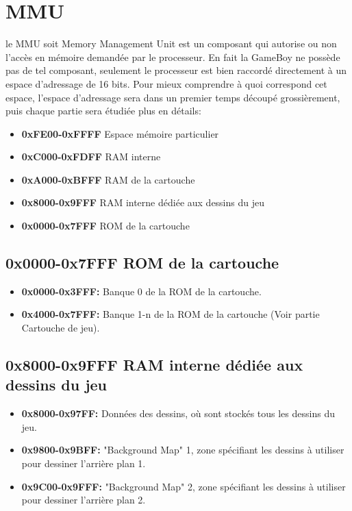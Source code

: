 \documentclass{report}
\begin{document}
\section{MMU}
le MMU soit Memory Management Unit est un composant qui autorise ou non l'accès en mémoire demandée par le processeur.
En fait la GameBoy ne possède pas de tel composant, seulement le processeur est bien raccordé directement à un espace d'adressage de 16 bits.
Pour mieux comprendre à quoi correspond cet espace, l'espace d'adressage sera
dans un premier temps découpé grossièrement, puis chaque partie sera étudiée
plus en détails:\\
\begin{itemize}
\item \textbf{0xFE00-0xFFFF} Espace mémoire particulier
\item \textbf{0xC000-0xFDFF} RAM interne
\item \textbf{0xA000-0xBFFF} RAM de la cartouche
\item \textbf{0x8000-0x9FFF} RAM interne dédiée aux dessins du jeu
\item \textbf{0x0000-0x7FFF} ROM de la cartouche
\end{itemize}

\subsection{0x0000-0x7FFF ROM de la cartouche}
\begin{itemize}
\item \textbf{0x0000-0x3FFF:} Banque 0 de la ROM de la cartouche.
\item \textbf{0x4000-0x7FFF:} Banque 1-n de la ROM de la cartouche (Voir partie Cartouche de jeu).
\end{itemize}

\subsection{0x8000-0x9FFF RAM interne dédiée aux dessins du jeu}
\begin{itemize}
\item \textbf{0x8000-0x97FF:} Données des dessins, où sont stockés tous les dessins du jeu.
\item \textbf{0x9800-0x9BFF:} "Background Map" 1, zone spécifiant les dessins à utiliser pour dessiner l'arrière plan 1.
\item \textbf{0x9C00-0x9FFF:} "Background Map" 2, zone spécifiant les dessins à utiliser pour dessiner l'arrière plan 2. 
\end{itemize} 
\end{document}
